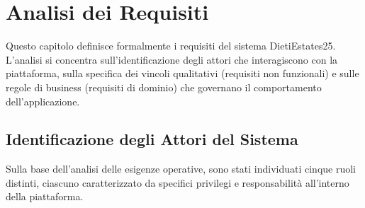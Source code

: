 \chapter{Analisi dei Requisiti}
\label{cap:requisiti}
Questo capitolo definisce formalmente i requisiti del sistema DietiEstates25. L'analisi si concentra 
sull'identificazione degli attori che interagiscono con la piattaforma, sulla specifica dei vincoli 
qualitativi (requisiti non funzionali) e sulle regole di business (requisiti di dominio) che governano 
il comportamento dell'applicazione.

\section{Identificazione degli Attori del Sistema}

Sulla base dell'analisi delle esigenze operative, sono stati individuati cinque ruoli distinti, ciascuno 
caratterizzato da specifici privilegi e responsabilità all'interno della piattaforma.

